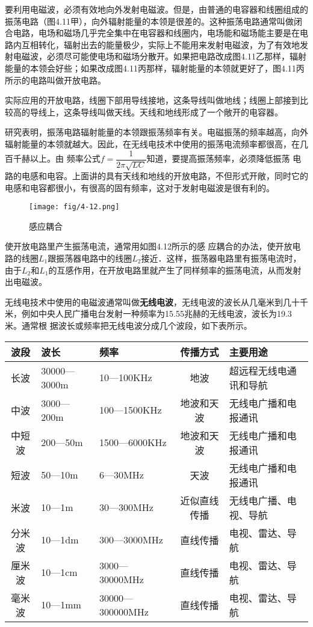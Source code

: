 要利用电磁波，必须有效地向外发射电磁波。但是，由普通的电容器和线圈组成的振荡电路（图4.11甲），向外辐射能量的本领是很差的。这种振荡电路通常叫做闭合电路，电场和磁场几乎完全集中在电容器和线圈内，电场能和磁场能主要是在电路内互相转化，辐射出去的能量极少，实际上不能用来发射电磁波，为了有效地发射电磁波，必须尽可能使电场和磁场分散开。如果把电路改成图4.11乙那样，辐射能量的本领会好些；如果改成图4.11丙那样，辐射能量的本领就更好了，图4.11丙所示的电路叫做开放电路。

实际应用的开放电路，线圈下部用导线接地，这条导线叫做地线；线圈上部接到比较高的导线上，这条导线叫做天线。天线和地线形成了一个敞开的电容器。

研究表明，振荡电路辐射能量的本领跟振荡频率有关。电磁振荡的频率越高，向外辐射能量的本领就越大。因此，在无线电技术中使用的振荡电流频率都很高，在几百千赫以上。由
频率公式$f=\dfrac{1}{2\pi\sqrt{LC}}$知道，要提高振荡频率，必须降低振荡
电路的电感和电容。上面讲的具有天线和地线的开放电路，不但形式开敞，同时它的电感和电容都很小，有很高的固有频率，这对于发射电磁波是很有利的。
\begin{figure}[htp]\centering
\texttt{[image: fig/4-12.png]}
\caption{感应耦合}
\end{figure}

使开放电路里产生振荡电流，通常用如图4.12所示的感
应耦合的办法，使开放电路的线圈$L_1$跟振荡器电路中的线圈$L_2$接近．这样，振荡器电路里有振荡电流时，由于$L_2$和$L_1$的互感作用，在开放电路里就产生了同样频率的振荡电流，从而发射出电磁波。

无线电技术中使用的电磁波通常叫做\textbf{无线电波}，无线电波的波长从几毫米到几十千米，例如中央人民广播电台发射一种频率为15.55兆赫的无线电波，波长为19.3米。通常根
据波长或频率把无线电波分成几个波段，如下表所示。

\begin{center}
\begin{tabular}{cp{}p{}cp{}}
	\hline
	波段  &  波长  & 频率 & 传播方式 & 主要用途
\\
\hline
长波    &  30000—3000m  & 10—100KHz   &地波    & 超远程无线电通讯和导航\\
中波   & 3000—200m   & 100—1500KHz   & 地波和天波   & 无线电广播和电报通讯\\
中短波   & 200—50m   & 1500—6000KHz  & 地波和天波   & 无线电广播和电报通讯\\
短波 & 50—10m   & 6—30MHz & 天波   & 无线电广播和电报通讯\\
米波 & 10—1m   & 30—300MHz   & 近似直线传播   &  无线电广播、电视、导航\\
分米波 & 10—1dm   & 300—3000MHz   & 直线传播   &  电视、雷达、导航\\  
厘米波& 10—1cm   &  3000—30000MHz   & 直线传播   &  电视、雷达、导航\\ 
毫米波 & 10—1mm 
  & 30000—300000MHz   & 直线传播   &  电视、雷达、导航\\
\hline
\end{tabular}

\end{center}


